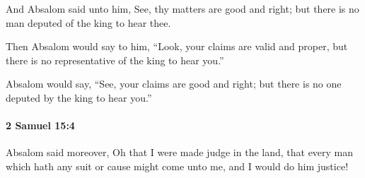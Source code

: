 			\begin{versebox}
					\item[BHS] 
					\item[ASV] And Absalom said unto him, See, thy matters are good and right; but there is no man deputed of the king to hear thee.
					\item[NIV] Then Absalom would say to him, “Look, your claims are valid and proper, but there is no representative of the king to hear you.”
					\item[NRSV] Absalom would say, “See, your claims are good and right; but there is no one deputed by the king to hear you.”
			\end{versebox}

		\paragraph{2 Samuel 15:4} %
			\label{2SAMUEL-15-4}

			Absalom said moreover, Oh that I were made judge in the land, that every man which hath any suit or cause might come unto me, and I would do him justice!

